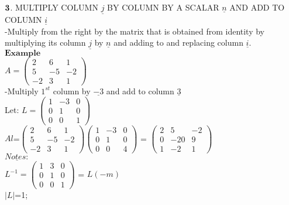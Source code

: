 \documentclass[]{article}
\begin{document}
\(\bold{3}\). MULTIPLY COLUMN \(\underline{j}\) BY COLUMN BY A SCALAR
\(\underline{n}\) AND ADD TO COLUMN \(\underline{i}\)\\

-Multiply from the right by the matrix that is obtained from identity by
multiplying its column \(\underline{j}\) by \(\underline{n}\) and adding
to and replacing column \(\underline{i}\).\\

\(\mathbf{Example}\)\\

\(A =\begin{pmatrix} 2 & 6 & 1\\ 5 & -5 & -2 \\ -2 & 3 & 1 \end{pmatrix}\)\\

-Multiply \(1^{st}\) column by \(\underline{-3}\) and add to column
\(\underline{3}\)\\

Let:
\(L =\begin{pmatrix} 1 & -3 & 0\\ 0 & 1 & 0 \\ 0 & 0 & 1 \end{pmatrix}\)\\

\(Al\)=\(\begin{pmatrix} 2 & 6 & 1\\ 5 & -5 & -2 \\ -2 & 3 & 1 \end{pmatrix}\begin{pmatrix} 1 & -3 & 0\\ 0 & 1 & 0 \\ 0 & 0 & 4 \end{pmatrix}\)
=
\(\begin{pmatrix} 2 & 5 & -2\\ 0 & -20 & 9 \\ 1 & -2 & 1 \end{pmatrix}\)\\

\(\underline{Notes:}\)\\

\(L^{-1} =\begin{pmatrix} 1 & 3 & 0\\ 0 & 1 & 0 \\ 0 & 0 & 1 \end{pmatrix}\)
= \(L(-m)\)\\
 \(|L|\)=1;\\
\end{document}
